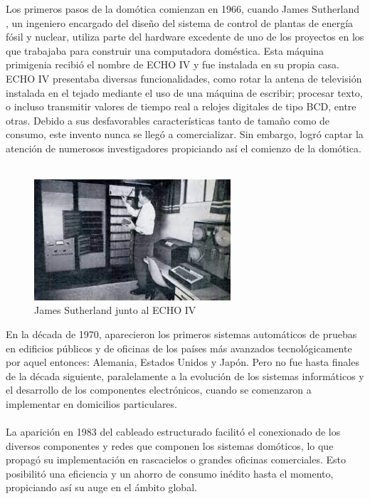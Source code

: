 Los primeros pasos de la domótica comienzan en 1966, cuando James Sutherland \cite{Cortesi:2015}, un ingeniero encargado del diseño del sistema de control de plantas de energía fósil y nuclear, utiliza parte del hardware excedente de uno de los proyectos en los que trabajaba para construir una computadora doméstica. Esta máquina primigenia recibió el nombre de ECHO IV \cite{CHM:2016} y fue instalada en su propia casa. ECHO IV presentaba diversas funcionalidades, como rotar la antena de televisión instalada en el tejado mediante el uso de una máquina de escribir; procesar texto, o incluso transmitir valores de tiempo real a relojes digitales de tipo BCD, entre otras. Debido a sus desfavorables características tanto de tamaño como de consumo, este invento nunca se llegó a comercializar. Sin embargo, logró captar la atención de numerosos investigadores propiciando así el comienzo de la domótica.\\\\
\begin{figure}[H]
\centering
\includegraphics[width=0.65\textwidth]{figures/echo.png}   
\caption{James Sutherland junto al ECHO IV}
\label{fig:echo}
\end{figure}
En la década de 1970, aparecieron los primeros sistemas automáticos de pruebas en edificios públicos y de oficinas de los países más avanzados tecnológicamente por aquel entonces: Alemania, Estados Unidos y Japón. Pero no fue hasta finales de la década siguiente, paralelamente a la evolución de los sistemas informáticos y el desarrollo de los componentes electrónicos, cuando se comenzaron a implementar en domicilios particulares. \\\\
La aparición en 1983 del cableado estructurado facilitó el conexionado de los diversos componentes y redes que componen los sistemas domóticos, lo que propagó su implementación en rascacielos o grandes oficinas comerciales. Esto posibilitó una eficiencia y un ahorro de consumo inédito hasta el momento, propiciando así su auge en el ámbito global. \\\\
